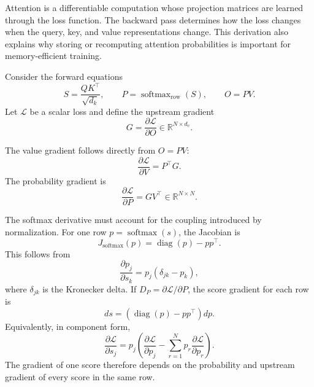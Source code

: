 Attention is a differentiable computation whose projection matrices are
learned through the loss function. The backward pass determines how the
loss changes when the query, key, and value representations change. This
derivation also explains why storing or recomputing attention probabilities
is important for memory-efficient training.

Consider the forward equations
\begin{equation}
    S=\frac{QK^\top}{\sqrt{d_k}},
    \qquad
    P=\operatorname{softmax}_{\mathrm{row}}(S),
    \qquad
    O=PV.
    \label{eq:attn-backward-forward}
\end{equation}
Let \(\mathcal{L}\) be a scalar loss and define the upstream gradient
\begin{equation}
    G=\frac{\partial\mathcal{L}}{\partial O}
    \in\mathbb{R}^{N\times d_v}.
    \label{eq:attn-upstream-gradient}
\end{equation}

The value gradient follows directly from \(O=PV\):
\begin{equation}
    \frac{\partial\mathcal{L}}{\partial V}
    =
    P^\top G.
    \label{eq:attn-gradient-value}
\end{equation}
The probability gradient is
\begin{equation}
    \frac{\partial\mathcal{L}}{\partial P}
    =
    GV^\top
    \in\mathbb{R}^{N\times N}.
    \label{eq:attn-gradient-probability}
\end{equation}

The softmax derivative must account for the coupling introduced by
normalization. For one row \(p=\operatorname{softmax}(s)\), the Jacobian
is
\begin{equation}
    J_{\mathrm{softmax}}(p)
    =
    \operatorname{diag}(p)-pp^\top.
    \label{eq:attn-softmax-jacobian}
\end{equation}
This follows from
\begin{equation}
    \frac{\partial p_j}{\partial s_k}
    =
    p_j(\delta_{jk}-p_k),
    \label{eq:attn-softmax-component-derivative}
\end{equation}
where \(\delta_{jk}\) is the Kronecker delta. If
\(D_P=\partial\mathcal{L}/\partial P\), the score gradient for each row is
\begin{equation}
    d s
    =
    \left(
        \operatorname{diag}(p)-pp^\top
    \right)d p.
    \label{eq:attn-softmax-backward}
\end{equation}
Equivalently, in component form,
\begin{equation}
    \frac{\partial\mathcal{L}}{\partial s_j}
    =
    p_j
    \left(
        \frac{\partial\mathcal{L}}{\partial p_j}
        -
        \sum_{r=1}^{N}
        p_r\frac{\partial\mathcal{L}}{\partial p_r}
    \right).
    \label{eq:attn-softmax-backward-component}
\end{equation}
The gradient of one score therefore depends on the probability and
upstream gradient of every score in the same row.

